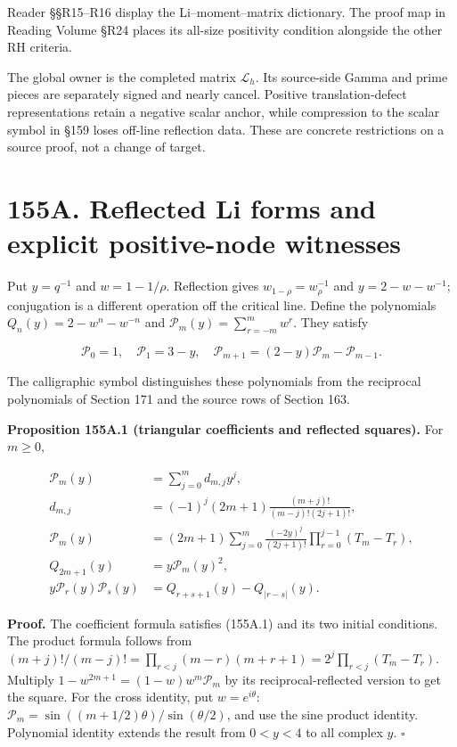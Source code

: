 \documentclass[
  11pt,
]{book}
\begin{document}
Reader §§R15--R16 display the Li--moment--matrix dictionary. The proof
map in Reading Volume §R24 places its all-size positivity condition
alongside the other RH criteria.

The global owner is the completed matrix \(\mathcal L_h\). Its
source-side Gamma and prime pieces are separately signed and nearly
cancel. Positive translation-defect representations retain a negative
scalar anchor, while compression to the scalar symbol in §159 loses
off-line reflection data. These are concrete restrictions on a source
proof, not a change of target.

\section{155A. Reflected Li forms and explicit positive-node
witnesses}\label{a.-reflected-li-forms-and-explicit-positive-node-witnesses}

Put \(y=q^{-1}\) and \(w=1-1/\rho\). Reflection gives
\(w_{1-\rho}=w_\rho^{-1}\) and \(y=2-w-w^{-1}\); conjugation is a
different operation off the critical line. Define the polynomials
\(Q_n(y)=2-w^n-w^{-n}\) and \(\mathcal P_m(y)=\sum_{r=-m}^{m}w^r\). They
satisfy

\[
\mathcal P_0=1,\quad \mathcal P_1=3-y,\quad
\mathcal P_{m+1}=(2-y)\mathcal P_m-\mathcal P_{m-1}.
\tag{155A.1}
\]

The calligraphic symbol distinguishes these polynomials from the
reciprocal polynomials of Section 171 and the source rows of Section
163.

\textbf{Proposition 155A.1 (triangular coefficients and reflected
squares).} For \(m\ge0\),

\[
\begin{aligned}
\mathcal P_m(y)&=\sum_{j=0}^m d_{m,j}y^j,\\
d_{m,j}&=(-1)^j(2m+1)\frac{(m+j)!}{(m-j)!(2j+1)!},\\
\mathcal P_m(y)&=(2m+1)\sum_{j=0}^m
 \frac{(-2y)^j}{(2j+1)!}\prod_{r=0}^{j-1}(T_m-T_r),\\
Q_{2m+1}(y)&=y\mathcal P_m(y)^2,\\
y\mathcal P_r(y)\mathcal P_s(y)&=Q_{r+s+1}(y)-Q_{|r-s|}(y).
\end{aligned}
\tag{155A.2}
\]

\textbf{Proof.} The coefficient formula satisfies (155A.1) and its two
initial conditions. The product formula follows from
\((m+j)!/(m-j)!=\prod_{r<j}(m-r)(m+r+1)=2^j\prod_{r<j}(T_m-T_r)\).
Multiply \(1-w^{2m+1}=(1-w)w^m\mathcal P_m\) by its reciprocal-reflected
version to get the square. For the cross identity, put
\(w=e^{i\theta}\): \(\mathcal P_m=\sin((m+1/2)\theta)/\sin(\theta/2)\),
and use the sine product identity. Polynomial identity extends the
result from \(0<y<4\) to all complex \(y\). \(\square\)
\end{document}
